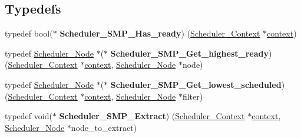 \subsection*{Typedefs}
\begin{DoxyCompactItemize}
\item 
\mbox{\label{group__RTEMSScoreSchedulerSMP_gaea2e75bdbe5076df7cb57346e7443a66}} 
typedef bool($\ast$ {\bfseries Scheduler\+\_\+\+S\+M\+P\+\_\+\+Has\+\_\+ready}) (\mbox{\hyperlink{structScheduler__Context}{Scheduler\+\_\+\+Context}} $\ast$\mbox{\hyperlink{sun4u_2tte_8h_a9b4a99475e2709333b8e5d70483173f1}{context}})
\item 
\mbox{\label{group__RTEMSScoreSchedulerSMP_gab81853fee1e85828d6eee744964d349e}} 
typedef \mbox{\hyperlink{structScheduler__Node}{Scheduler\+\_\+\+Node}} $\ast$($\ast$ {\bfseries Scheduler\+\_\+\+S\+M\+P\+\_\+\+Get\+\_\+highest\+\_\+ready}) (\mbox{\hyperlink{structScheduler__Context}{Scheduler\+\_\+\+Context}} $\ast$\mbox{\hyperlink{sun4u_2tte_8h_a9b4a99475e2709333b8e5d70483173f1}{context}}, \mbox{\hyperlink{structScheduler__Node}{Scheduler\+\_\+\+Node}} $\ast$node)
\item 
\mbox{\label{group__RTEMSScoreSchedulerSMP_ga1df2a5f2eece3f46d7c754885328f0fa}} 
typedef \mbox{\hyperlink{structScheduler__Node}{Scheduler\+\_\+\+Node}} $\ast$($\ast$ {\bfseries Scheduler\+\_\+\+S\+M\+P\+\_\+\+Get\+\_\+lowest\+\_\+scheduled}) (\mbox{\hyperlink{structScheduler__Context}{Scheduler\+\_\+\+Context}} $\ast$\mbox{\hyperlink{sun4u_2tte_8h_a9b4a99475e2709333b8e5d70483173f1}{context}}, \mbox{\hyperlink{structScheduler__Node}{Scheduler\+\_\+\+Node}} $\ast$filter)
\item 
\mbox{\label{group__RTEMSScoreSchedulerSMP_ga11fa843f80ef12c9f610d01403ee24cf}} 
typedef void($\ast$ {\bfseries Scheduler\+\_\+\+S\+M\+P\+\_\+\+Extract}) (\mbox{\hyperlink{structScheduler__Context}{Scheduler\+\_\+\+Context}} $\ast$\mbox{\hyperlink{sun4u_2tte_8h_a9b4a99475e2709333b8e5d70483173f1}{context}}, \mbox{\hyperlink{structScheduler__Node}{Scheduler\+\_\+\+Node}} $\ast$node\+\_\+to\+\_\+extract)
\item 
\mbox{\label{group__RTEMSScoreSchedulerSMP_ga8bdef7811e1586177e8bdc4bef2dd28c}} 

\end{DoxyCompactItemize}
